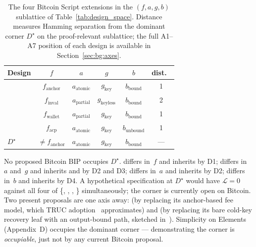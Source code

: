 \begin{table}[t]
\centering
\caption{The four Bitcoin Script extensions in the $(f, a, g, b)$
sublattice of Table~\ref{tab:design_space}. Distance measures Hamming
separation from the dominant corner $D^\star$ on the proof-relevant
sublattice; the full A1--A7 position of each design is available in
Section~\ref{sec:bg:axes}.}
\label{tab:pareto-summary}
\small
\begin{tabular}{@{}lccccc@{}}
\toprule
Design     & $f$                      & $a$                  & $g$                     & $b$                    & dist.\ \\
\midrule
\opctv{}        & $f_{\text{anchor}}$      & $a_{\text{atomic}}$  & $g_{\text{key}}$        & $b_{\text{bound}}$     & 1 \\
\opccv{}        & $f_{\text{inval}}$       & $a_{\text{partial}}$ & $g_{\text{keyless}}$    & $b_{\text{bound}}$     & 2 \\
\opvault{} & $f_{\text{wallet}}$      & $a_{\text{partial}}$ & $g_{\text{key}}$        & $b_{\text{bound}}$     & 1 \\
\catcsfs{}   & $f_{\text{acp}}$         & $a_{\text{atomic}}$  & $g_{\text{key}}$        & $b_{\text{unbound}}$   & 1 \\
$D^\star$  & $\neq f_{\text{anchor}}$ & $a_{\text{atomic}}$  & $g_{\text{key}}$        & $b_{\text{bound}}$     & --- \\
\bottomrule
\end{tabular}
\end{table}

No proposed Bitcoin BIP occupies $D^\star$. \opctv{} differs
in~$f$ and inherits \classfee{} by D1; \opccv{} differs in~$a$
and~$g$ and inherits \classscale{} and \classgrief{} by D2 and D3;
\opvault{} differs in~$a$ and inherits \classscale{} by D2;
\catcsfs{} differs in~$b$ and inherits \classcold{} by D4. A
hypothetical specification at $D^\star$ would have $\mathcal{L} = 0$
against all four of \{\classfee{}, \classgrief{}, \classscale{},
\classcold{}\} simultaneously; the corner is currently open on
Bitcoin. Two present proposals are one axis away: \opctv{}
(by replacing its anchor-based fee model, which TRUC
adoption~\cite{TRUC} approximates) and \catcsfs{} (by replacing its
bare cold-key recovery leaf with an output-bound path, sketched
in~\cite{Poe21}). Simplicity on Elements (Appendix~D) occupies the
dominant corner --- demonstrating the corner is \emph{occupiable},
just not by any current Bitcoin proposal.
\label{thm:fee_inversion}\label{cor:open_corner}


